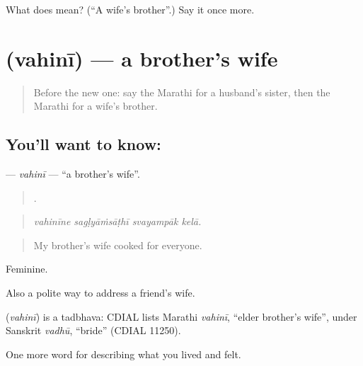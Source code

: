 \begin{tcolorbox}[breakable,colback=teal!4,colframe=teal!35!black,title={Before you move on}]
What does  mean? (\textquotedblleft{}A wife's brother\textquotedblright{}.) Say it once more.
\end{tcolorbox}
\section[\texorpdfstring{\mr{वहिनी} (vahinī)}{वहिनी (vahinī)}]{ (vahinī) — a brother's wife}

\label{lesson:MR-C496-vahini}



\begin{quote}
Before the new one: say the Marathi for a husband's sister, then the Marathi for a wife's brother.
\end{quote}

\subsection*{You'll want to know: }
\textbf{} — \emph{vahinī} — \textquotedblleft{}a brother's wife\textquotedblright{}.

\begin{quote}
   .
\end{quote}

\begin{quote}
\emph{vahinīne sagḷyāṁsāṭhī svayampāk kelā.}
\end{quote}

\begin{quote}
My brother's wife cooked for everyone.
\end{quote}

Feminine.

Also a polite way to address a friend's wife.

\begin{cousinweb}
\textbf{} (\emph{vahinī}) is a tadbhava: CDIAL lists Marathi \emph{vahinī}, \textquotedblleft{}elder brother's wife\textquotedblright{}, under Sanskrit \emph{vadhū}, \textquotedblleft{}bride\textquotedblright{} (CDIAL 11250).
\end{cousinweb}

\begin{grammarlens}[title={What you've built}]
One more word for describing what you lived and felt.
\end{grammarlens}

